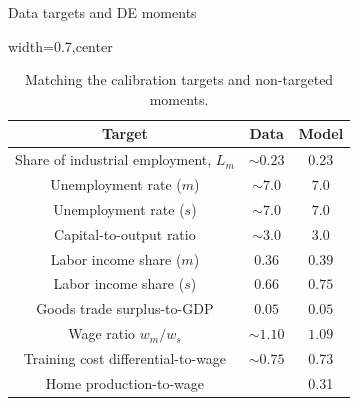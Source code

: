 \documentclass[9pt,xcolor={svgnames}]{beamer}
\begin{document}
\begin{frame}{Data targets and DE moments}


\begin{table}[h!]
\centering
\caption{Matching the calibration targets and non-targeted moments.}\label{table_calibration_targets}
\begin{adjustbox}{width=0.7\columnwidth,center}
\begin{tabular}{||c c c||}\hline
\textbf{Target} & \textbf{Data} & \textbf{Model} \\\hline\hline
Share of industrial employment, $L_m$ & $\sim 0.23$ & $0.23$ \\
Unemployment rate ($m$)  & $\sim 7.0$ & $7.0$ \\
Unemployment rate ($s$)  & $\sim 7.0$ & $7.0$ \\
Capital-to-output ratio & $\sim 3.0$ & $3.0$ \\
Labor income share ($m$)  & $0.36$ & $0.39$ \\
Labor income share ($s$)  & $0.66$ & $0.75$ \\
Goods trade surplus-to-GDP & $0.05$ &  $0.05$ \\
Wage ratio $w_m/w_s$ & $\sim 1.10$ & $1.09$  \\
Training cost differential-to-wage & $\sim 0.75$ & 0.73 \\
Home production-to-wage     &     &   0.31  
\\\hline
\end{tabular}
\end{adjustbox}
\end{table}

    
\end{frame}
\end{document}
